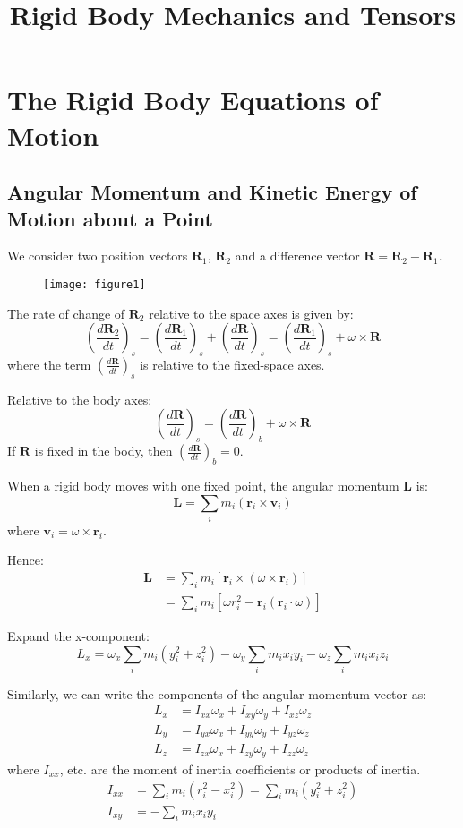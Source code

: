 \documentclass[12pt]{article}
\title{Rigid Body Mechanics and Tensors}
\author{}
\date{}
\renewcommand{\vec}[1]{\mathbf{#1}}
\begin{document}
	
	\maketitle
	
	\section{The Rigid Body Equations of Motion}
	
	\subsection{Angular Momentum and Kinetic Energy of Motion about a Point}
	

	We consider two position vectors $\vec{R}_1$, $\vec{R}_2$ and a difference vector $\vec{R} = \vec{R}_2 - \vec{R}_1$.
	
	\begin{figure}[h]
		\centering
		\texttt{[image: figure1]}
		\caption{}
		\label{fig:figure1}
	\end{figure}
	
	The rate of change of $\vec{R}_2$ relative to the space axes is given by:
	\[
	\left(\frac{d\vec{R}_2}{dt}\right)_s = \left(\frac{d\vec{R}_1}{dt}\right)_s + \left(\frac{d\vec{R}}{dt}\right)_s = \left(\frac{d\vec{R}_1}{dt}\right)_s + \omega \times \vec{R}
	\]
	where the term $\left(\frac{d\vec{R}}{dt}\right)_s$ is relative to the fixed-space axes.
	
	Relative to the body axes:
	\[
	\left(\frac{d\vec{R}}{dt}\right)_s = \left(\frac{d\vec{R}}{dt}\right)_b + \omega \times \vec{R}
	\]
	If $\vec{R}$ is fixed in the body, then $\left(\frac{d\vec{R}}{dt}\right)_b = 0$.
	
	When a rigid body moves with one fixed point, the angular momentum $\vec{L}$ is:
	\[
	\vec{L} = \sum_i m_i (\vec{r}_i \times \vec{v}_i)
	\]
	where $\vec{v}_i = \omega \times \vec{r}_i$.
	
	Hence:
	\begin{align*}
		\vec{L} &= \sum_i m_i [\vec{r}_i \times (\omega \times \vec{r}_i)] \\
		&= \sum_i m_i [\omega r_i^2 - \vec{r}_i (\vec{r}_i \cdot \omega)]
	\end{align*}
	
	Expand the x-component:
	\[
	L_x = \omega_x \sum_i m_i (y_i^2 + z_i^2) - \omega_y \sum_i m_i x_i y_i - \omega_z \sum_i m_i x_i z_i
	\]
	
	Similarly, we can write the components of the angular momentum vector as:
	\begin{align*}
		L_x &= I_{xx} \omega_x + I_{xy} \omega_y + I_{xz} \omega_z \\
		L_y &= I_{yx} \omega_x + I_{yy} \omega_y + I_{yz} \omega_z \\
		L_z &= I_{zx} \omega_x + I_{zy} \omega_y + I_{zz} \omega_z
	\end{align*}
	where $I_{xx}$, etc. are the moment of inertia coefficients or products of inertia.
	\begin{align*}
		I_{xx} &= \sum_i m_i (r_i^2 - x_i^2) = \sum_i m_i (y_i^2 + z_i^2) \\
		I_{xy} &= -\sum_i m_i x_i y_i
	\end{align*}
	
\end{document}
